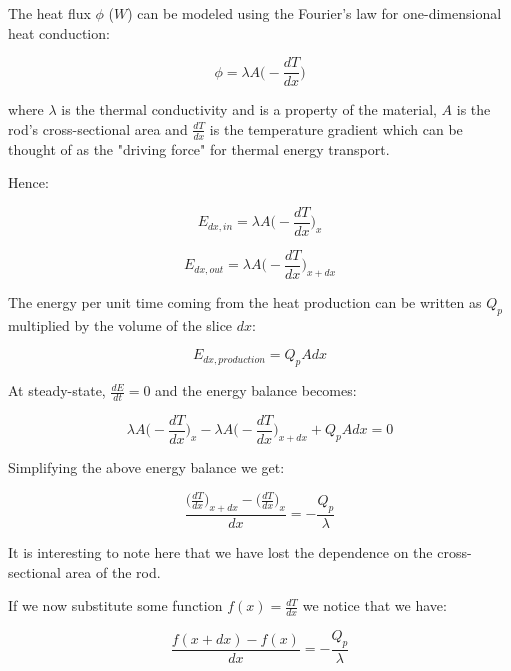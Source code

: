 The heat flux $\phi$ ($W$) can be modeled using the Fourier's law for one-dimensional heat conduction:

\begin{equation}
\phi = \lambda A \Big(- \frac{dT}{dx} \Big)
\label{eq:fourier}
\end{equation}

where $\lambda$ is the thermal conductivity and is a property of the material, $A$ is the rod's cross-sectional area and $\frac{dT}{dx}$ is the temperature gradient which can be thought of as the "driving force" for thermal energy transport.

Hence:

\begin{equation}
E_{dx, in} = \lambda A \Big(- \frac{dT}{dx} \Big)_x
\end{equation}

\begin{equation}
E_{dx, out} = \lambda A \Big(- \frac{dT}{dx} \Big)_{x + dx}
\end{equation}

The energy per unit time coming from the heat production can be written as $Q_p$ multiplied by the volume of the slice $dx$:

\begin{equation}
E_{dx, production} = Q_p A dx
\end{equation}

At steady-state, $\frac{dE}{dt} = 0$ and the energy balance becomes:

\begin{equation}
\lambda A \Big(- \frac{dT}{dx} \Big)_x - \lambda A \Big(- \frac{dT}{dx} \Big)_{x + dx} + Q_p A dx = 0
\end{equation}

Simplifying the above energy balance we get:

\begin{equation*}
\frac{\Big(\frac{dT}{dx} \Big)_{x + dx} - \Big(\frac{dT}{dx} \Big)_x  }{dx} = - \frac{Q_p}{\lambda}
\end{equation*}

It is interesting to note here that we have lost the dependence on the cross-sectional area of the rod.

If we now substitute some function $f(x) = \frac{dT}{dx}$ we notice that we have:

\begin{equation*}
\frac{f(x + dx) - f(x)}{dx} = - \frac{Q_p}{\lambda}
\end{equation*}


